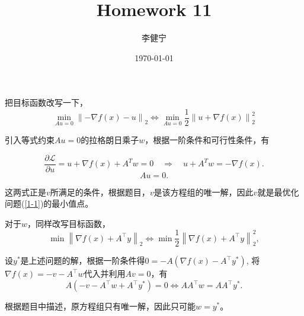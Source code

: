 \documentclass{homework}
\author{李健宁}
\date{\today}
\title{Homework 11}
\begin{document}
 \maketitle

\question

\begin{sol}
把目标函数改写一下，
\begin{equation}
\min_{A u = 0} \left\| -\nabla f(x) - u \right\|_2 \Leftrightarrow \min_{A u = 0}
\frac{1}{2}\left\|u + \nabla f(x)\right\|_2^2 \label{1-1}
\end{equation}

引入等式约束$Au=0$的拉格朗日乘子$w$，根据一阶条件和可行性条件，有

    \[
    \frac{\partial \mathcal{L}}{\partial u} = u + \nabla f(x) + A^T w = 0
    \quad \Rightarrow \quad
    u + A^T w = -\nabla f(x).
    \]
    \[
    A u = 0.
    \]

这两式正是$v$所满足的条件，根据题目，$v$是该方程组的唯一解，因此$v$就是最优化问题(\ref{1-1})的最小值点。

对于$w$，同样改写目标函数，
\begin{equation*}
    \min\left\| \nabla f(x) + A^\top y \right\|_2 \Leftrightarrow   \min\frac{1}{2}\left\| \nabla f(x) + A^\top y \right\|_2^2,
\end{equation*}

设$y^*$是上述问题的解，根据一阶条件得$0 = -A(\nabla f(x) - A^\top y^*)$, 将$\nabla f(x) = -v - A^\top w $代入并利用$Av=0$，有
\begin{equation*}
    A(-v - A^\top w + A^\top y^*) = 0 \Leftrightarrow   AA^\top w =AA^\top y^*.
\end{equation*}

根据题目中描述，原方程组只有唯一解，因此只可能$w= y^*$。

\end{sol}

\question
\end{document}
